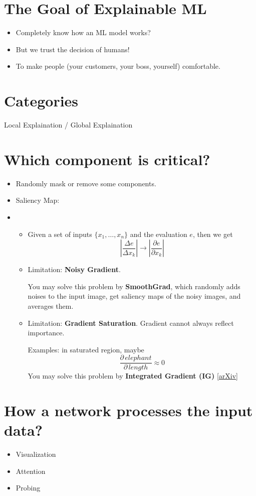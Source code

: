 \documentclass[11pt]{book}
\begin{document}
\section{The Goal of Explainable ML}
\begin{itemize}
    \item Completely know how an ML model works?
    \item But we trust the decision of humans!
    \item To make people (your customers, your boss, yourself) comfortable.
\end{itemize}
\section{Categories}
\noindent Local Explaination / Global Explaination
\section{Which component is critical?}
\begin{itemize}
    \item Randomly mask or remove some components.
    \item Saliency Map:
    \item
    \begin{itemize}
        \item Given a set of inputs $\{x_1,\dots,x_n\}$ and the evaluation $e$, then we get
        \[
            |\frac{\Delta e}{\Delta x_k}|\to|\frac{\partial e}{\partial x_k}|
        \]
        \item Limitation: \textbf{Noisy Gradient}. \par
        You may solve this problem by \textbf{SmoothGrad}, which randomly adds noises to the input image, get saliency maps of the noisy images, and averages them.
        \item Limitation: \textbf{Gradient Saturation}. Gradient cannot always reflect importance.\par
        Examples: in saturated region, maybe
        \[
            \frac{\partial\,elephant}{\partial\,length}\approx 0
        \]
        You may solve this problem by \textbf{Integrated Gradient (IG)} [\href{https://arxiv.org/abs/1611.02639}{arXiv}]
    \end{itemize}
\end{itemize}
\section{How a network processes the input data?}
\begin{itemize}
    \item Visualization
    \item Attention
    \item Probing
\end{itemize}
\end{document}
